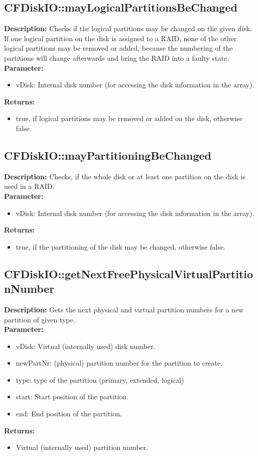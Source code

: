 \subsection{CFDiskIO::mayLogicalPartitionsBeChanged}
\textbf{Description:} Checks if the logical partitions may be changed on the given disk. If one logical partition on the disk is assigned to a RAID, none of the other logical partitions may be removed or added, because the numbering of the partitions will change afterwards and bring the RAID into a faulty state.\\
\textbf{Parameter:}
\begin{itemize}
\item vDisk: Internal disk number (for accessing the disk information in the array).
\end{itemize}
\textbf{Returns:}
\begin{itemize}
\item true, if logical partitions may be removed or added on the disk, otherwise false.
\end{itemize}

\subsection{CFDiskIO::mayPartitioningBeChanged}
\textbf{Description:} Checks, if the whole disk or at least one partition on the disk is used in a RAID.\\
\textbf{Parameter:}
\begin{itemize}
\item vDisk: Internal disk number (for accessing the disk information in the array).
\end{itemize}
\textbf{Returns:}
\begin{itemize}
\item true, if the partitioning of the disk may be changed, otherwise false.
\end{itemize}

\subsection{CFDiskIO::getNextFreePhysicalVirtualPartitionNumber}
\textbf{Description:} Gets the next physical and virtual partition numbers for a new partition of given type.\\
\textbf{Parameter:}
\begin{itemize}
\item vDisk: Virtual (internally used) disk number.
\item newPartNr: (physical) partition number for the partition to create.
\item type: type of the partition (primary, extended, logical)
\item start: Start position of the partition.
\item end: End position of the partition.
\end{itemize}
\textbf{Returns:}
\begin{itemize}
\item Virtual (internally used) partition number.
\end{itemize}

